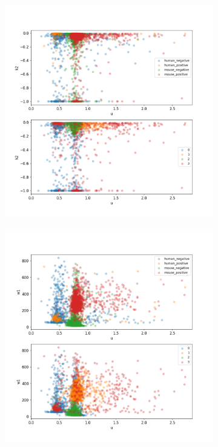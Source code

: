 \begin{figure}
\begin{subfigure}{0.3\textwidth}
	\end{subfigure}
	\hfill
	\begin{subfigure}{0.3\textwidth}
		\includegraphics[width=\textwidth]{fig/seperate_u_k2}
	\end{subfigure}
	\hfill
	\begin{subfigure}{0.3\textwidth}
		\includegraphics[width=\textwidth]{fig/seperate_u_w1}

\end{subfigure}
\end{figure}
